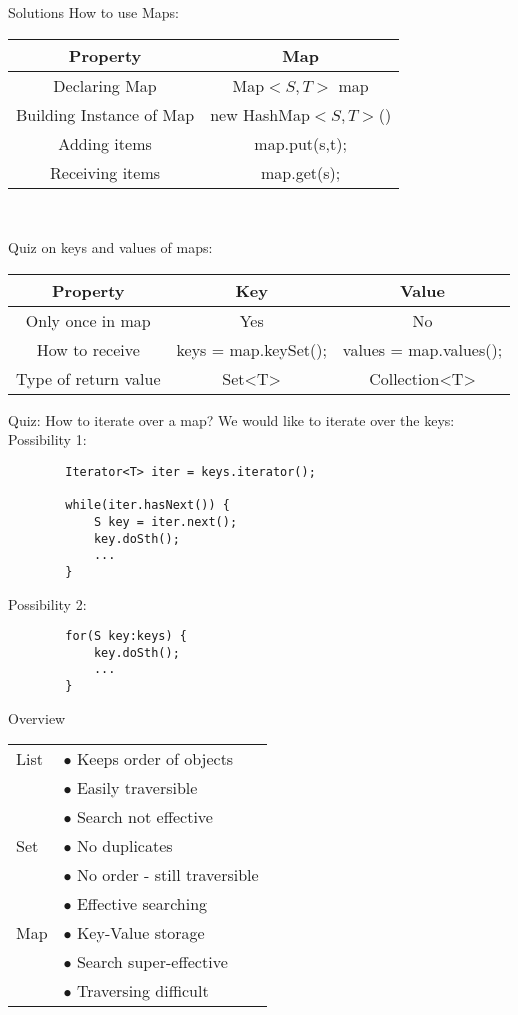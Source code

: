 \begin{frame}{Solutions}
	How to use Maps:\\
	\begin{tabular}{c|c}
		Property&Map\\
		\hline
		Declaring Map&Map$< S,T >$ map\\
		Building Instance of Map&new HashMap$<S,T>$()\\
		Adding items&map.put(s,t);\\
		Receiving items&map.get(s);
	\end{tabular}\\
	\vspace{1cm}
	
	Quiz on keys and values of maps:\\
	\vspace{0.5cm}
	\begin{tabular}{c|c|c}
		Property&Key&Value\\
		\hline
		Only once in map&Yes&No\\
		How to receive&keys = map.keySet();&values = map.values();\\
		Type of return value&Set<T>&Collection<T>\\
	\end{tabular}
\end{frame}

\begin{frame}[fragile]{Quiz: How to iterate over a map?}
	We would like to iterate over the keys: \\
	Possibility 1:
	\pause
	\begin{lstlisting}
		Iterator<T> iter = keys.iterator();
		
		while(iter.hasNext()) {
			S key = iter.next();
			key.doSth();
			...
		}
	\end{lstlisting}
	
	\pause
	Possibility 2:
	\pause
	\begin{lstlisting}
		for(S key:keys) {
			key.doSth();
			...
		}
	\end{lstlisting}
\end{frame}

\begin{frame}{Overview}
	\begin{center}
		\begin{tabular}{ l | l }
			List & $ \bullet $ Keeps order of objects \\
			& $ \bullet $ Easily traversible \\
			& $ \bullet $ Search not effective \\
			\hline
			Set  & $ \bullet $ No duplicates \\
			& $ \bullet $ No order - still traversible \\
			& $ \bullet $ Effective searching \\
			\hline
			Map  & $ \bullet $ Key-Value storage \\
			& $ \bullet $ Search super-effective \\
			& $ \bullet $ Traversing difficult
			
		\end{tabular}
	\end{center}
\end{frame}

